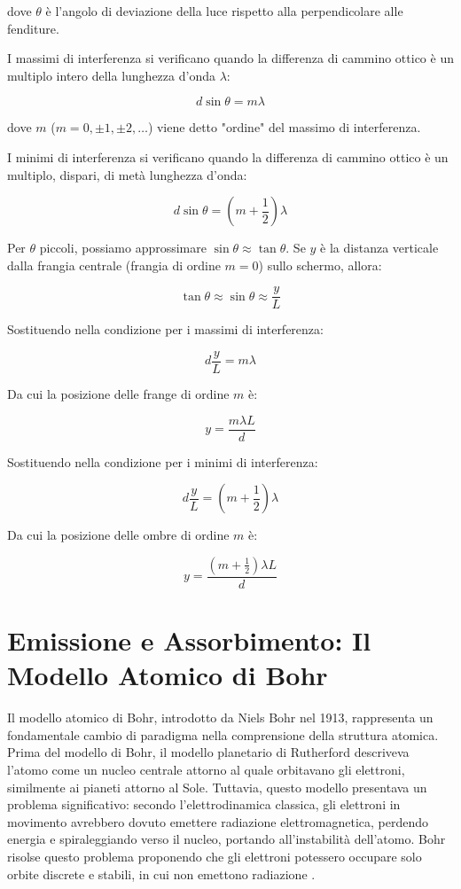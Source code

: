 \documentclass[12pt,a4paper]{report}
\begin{document}
dove \(\theta\) è l'angolo di deviazione della luce rispetto alla perpendicolare alle fenditure.

I massimi di interferenza si verificano quando la differenza di cammino ottico è un multiplo intero della lunghezza d'onda \(\lambda\):
 
\[ d \sin \theta = m \lambda \]

dove \(m\) (\(m = 0, \pm 1, \pm 2, \ldots\)) viene detto "ordine" del massimo di interferenza.
  
I minimi di interferenza si verificano quando la differenza di cammino ottico è un multiplo, dispari, di metà lunghezza d'onda: 

\[ d \sin \theta = \left( m + \frac{1}{2} \right) \lambda \]

Per \(\theta\) piccoli, possiamo approssimare \(\sin \theta \approx \tan \theta\). Se \(y\) è la distanza verticale dalla frangia centrale (frangia di ordine \(m=0\)) sullo schermo, allora:

\[ \tan \theta \approx \sin \theta \approx \frac{y}{L} \]

Sostituendo nella condizione per i massimi di interferenza:

\[ d \frac{y}{L} = m \lambda \]

Da cui la posizione delle frange di ordine \(m\) è:

\[ y = \frac{m \lambda L}{d} \]

Sostituendo nella condizione per i minimi di interferenza:

\[ d \frac{y}{L} = \left( m + \frac{1}{2} \right) \lambda \]

Da cui la posizione delle ombre di ordine \(m\) è:

\[ y = \frac{\left(m + \frac{1}{2} \right) \lambda L}{d} \]

\section{Emissione e Assorbimento: Il Modello Atomico di Bohr}

Il modello atomico di Bohr, introdotto da Niels Bohr nel 1913, rappresenta un fondamentale cambio di paradigma nella comprensione della struttura atomica. Prima del modello di Bohr, il modello planetario di Rutherford descriveva l'atomo come un nucleo centrale attorno al quale orbitavano gli elettroni, similmente ai pianeti attorno al Sole. Tuttavia, questo modello presentava un problema significativo: secondo l'elettrodinamica classica, gli elettroni in movimento avrebbero dovuto emettere radiazione elettromagnetica, perdendo energia e spiraleggiando verso il nucleo, portando all'instabilità dell'atomo. Bohr risolse questo problema proponendo che gli elettroni potessero occupare solo orbite discrete e stabili, in cui non emettono radiazione \cite{Bohr1913}.
\end{document}

